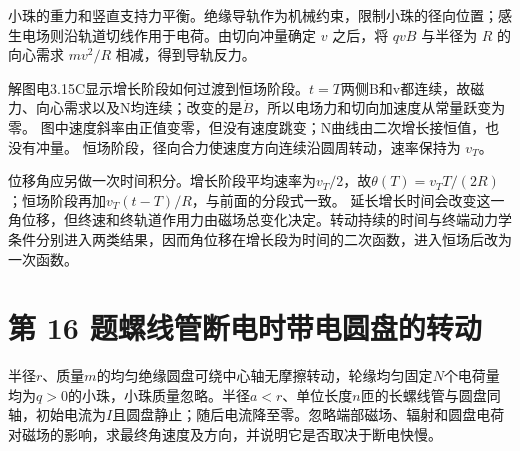 \documentclass[UTF8,fontset=fandol,a4paper,11pt]{ctexart}
\newcommand{\figcaption}[1]{\par\vspace{2pt}{\small\color{muted}#1}\par}
\begin{document}
小珠的重力和竖直支持力平衡。绝缘导轨作为机械约束，限制小珠的径向位置；感生电场则沿轨道切线作用于电荷。由切向冲量确定 $v$ 之后，将 $qvB$ 与半径为 $R$ 的向心需求 $mv^2/R$ 相减，得到导轨反力。

解图电3.15C显示增长阶段如何过渡到恒场阶段。$t=T$两侧B和v都连续，故磁力、向心需求以及N均连续；改变的是$\dot B$，所以电场力和切向加速度从常量跃变为零。
图中速度斜率由正值变零，但没有速度跳变；N曲线由二次增长接恒值，也没有冲量。
恒场阶段，径向合力使速度方向连续沿圆周转动，速率保持为 $v_T$。

位移角应另做一次时间积分。增长阶段平均速率为$v_T/2$，故$\theta(T)=v_TT/(2R)$；恒场阶段再加$v_T(t-T)/R$，与前面的分段式一致。
延长增长时间会改变这一角位移，但终速和终轨道作用力由磁场总变化决定。转动持续的时间与终端动力学条件分别进入两类结果，因而角位移在增长段为时间的二次函数，进入恒场后改为一次函数。




\section*{第 16 题\quad 螺线管断电时带电圆盘的转动}\label{q:16}

半径$r$、质量$m$的均匀绝缘圆盘可绕中心轴无摩擦转动，轮缘均匀固定$N$个电荷量均为$q>0$的小珠，小珠质量忽略。半径$a<r$、单位长度$n$匝的长螺线管与圆盘同轴，初始电流为$I$且圆盘静止；随后电流降至零。忽略端部磁场、辐射和圆盘电荷对磁场的影响，求最终角速度及方向，并说明它是否取决于断电快慢。

\begin{center}\begin{minipage}{.98\linewidth}\centering
{}\figcaption{图电3.16\quad 轮缘在磁场区域外；电流从$I$降至零。}\end{minipage}\end{center}
\end{document}
